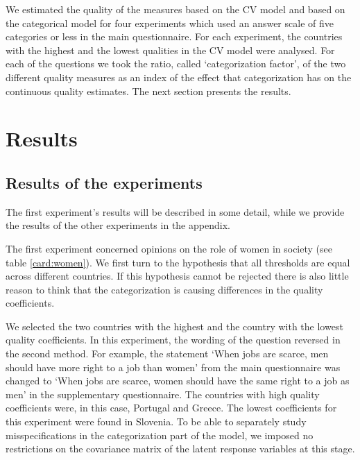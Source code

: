 \documentclass[a4paper,12pt]{article}
\begin{document}
We estimated the quality of the measures based on the CV model and based on the categorical model for four experiments which used an answer scale of five categories or less in the main questionnaire. For each experiment, the countries with the highest and the lowest qualities in the CV model were analysed.  For each of the questions we took the ratio, called `categorization factor', of the two different quality measures as an index of the effect that categorization has on the continuous quality estimates. The next section presents the results.


\section{Results}

\subsection{Results of the experiments}

The first experiment's results will be described in some detail, while we provide the results of the other experiments in the appendix.

The first experiment concerned opinions on the role of women in society (see table \ref{card:women}). We first turn to the hypothesis that all thresholds are equal across different countries. If this hypothesis cannot be rejected  there is also little reason to think that the categorization is causing differences in the quality coefficients. 

We selected the two countries with the highest and the country with the lowest quality coefficients. In this experiment, the wording of the question reversed in the second method. For example, the statement `When jobs are scarce, men should have more right to a job than women' from the main questionnaire was changed to `When jobs are scarce, women should have the same right to a job as men' in the supplementary questionnaire. The countries with high quality coefficients were, in this case, Portugal and Greece. The lowest coefficients for this experiment were found in Slovenia. To be able to separately study misspecifications in the categorization part of the model, we imposed no restrictions on the covariance matrix of the latent response variables at this stage. 
\end{document}
